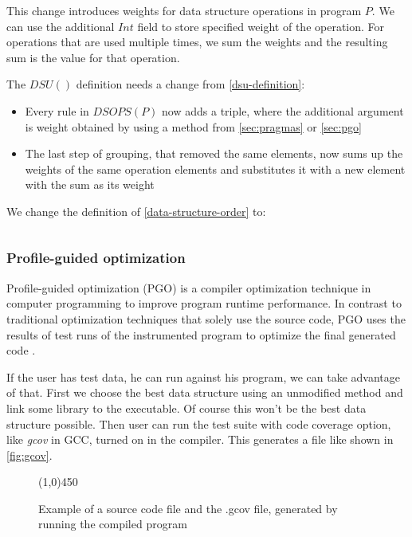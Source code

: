 \documentclass[a4paper,11pt]{article}
\begin{document}
			This change introduces weights for data structure operations in program $P$. We can use the
			additional $Int$ field to store specified weight of the operation.  For operations that are used
			multiple times, we sum the weights and the resulting sum is the value for that operation.

			The $DSU()$ definition needs a change from \autoref{dsu-definition}:

			\begin{itemize}
				\item Every rule in $DSOPS(P)$ now adds a triple, where the additional argument is
					weight obtained by using a method from \autoref{sec:pragmas} or
					\autoref{sec:pgo}

				\item The last step of grouping, that removed the same elements, now sums up the weights
					of the same operation elements and substitutes it with a new element with the
					sum as its weight
			\end{itemize}

			We change the definition of \autoref{data-structure-order} to:

			\begin{equation}
			\end{equation}

		\subsubsection{Profile-guided optimization} \label{sec:pgo}

			Profile-guided optimization (PGO) is a compiler optimization technique in computer programming
			to improve program runtime performance.  In contrast to traditional optimization techniques that
			solely use the source code, PGO uses the results of test runs of the instrumented program to
			optimize the final generated code .

			If the user has test data, he can run against his program, we can take advantage of that.  First
			we choose the best data structure using an unmodified method and link some library to the
			executable. Of course this won't be the best data structure possible. Then user can run the test
			suite with code coverage option, like \emph{gcov} in GCC, turned on in the compiler. This
			generates a file like shown in \autoref{fig:gcov}.

			\begin{figure} \label{fig:gcov}
				

				\centering \line(1,0){450}

				

				\caption{Example of a source code file and the .gcov file, generated by running the
				compiled program}

				\label{fig:gcov}
			\end{figure}
\end{document}
